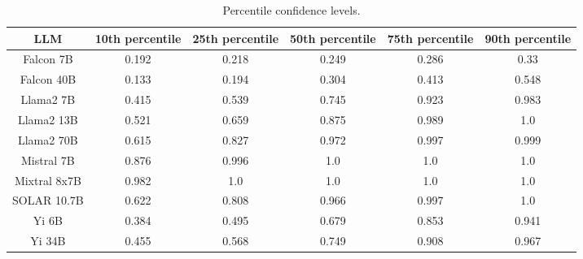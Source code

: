 \begin{table*}
\centering
\begin{tabular}{c|c|c|c|c|c}
LLM & 10th percentile & 25th percentile & 50th percentile & 75th percentile & 90th percentile\\ \hline
Falcon 7B & 0.192 & 0.218 & 0.249 & 0.286 & 0.33\\
Falcon 40B & 0.133 & 0.194 & 0.304 & 0.413 & 0.548\\
Llama2 7B & 0.415 & 0.539 & 0.745 & 0.923 & 0.983\\
Llama2 13B & 0.521 & 0.659 & 0.875 & 0.989 & 1.0\\
Llama2 70B & 0.615 & 0.827 & 0.972 & 0.997 & 0.999\\
Mistral 7B & 0.876 & 0.996 & 1.0 & 1.0 & 1.0\\
Mixtral 8x7B & 0.982 & 1.0 & 1.0 & 1.0 & 1.0\\
SOLAR 10.7B & 0.622 & 0.808 & 0.966 & 0.997 & 1.0\\
Yi 6B & 0.384 & 0.495 & 0.679 & 0.853 & 0.941\\
Yi 34B & 0.455 & 0.568 & 0.749 & 0.908 & 0.967\\
\hline
\end{tabular}
\caption{Percentile confidence levels.}
\label{tab:percentile_conf}
\end{table*}
